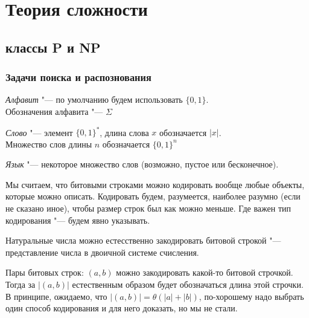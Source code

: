 
\setcounter{section}{4}
\chapter{Теория сложности}
\section{классы P и NP} 
\subsection{Задачи поиска и распознования}
\begin{Def}
	\textit{Алфавит} "--- по умолчанию будем использовать $\{0,1\}$.\\ 
	Обозначения алфавита "--- $\Sigma$
\end{Def}

\begin{Def}
	\textit{Слово} "--- элемент $\{0,1\}^*$, длина слова $x$ обозначается $|x|$.\\
	Множество слов длины $n$ обозначается $\{0, 1\}^n$\\
\end{Def}

\begin{Def}
	\textit{Язык} "--- некоторое множество слов (возможно, пустое или бесконечное).
\end{Def}

\begin{Rem}
	Мы считаем, что битовыми строками можно кодировать вообще любые объекты, которые можно описать.
	Кодировать будем, разумеется, наиболее разумно (если не сказано иное), чтобы размер строк был как можно меньше.
	Где важен тип кодирования "--- будем явно указывать.
\end{Rem}

\begin{exmp}
	Натуральные числа можно естесственно закодировать битовой строкой "--- представление числа в двоичной системе счисления.
\end{exmp}

\begin{exmp}
	Пары битовых строк: $(a, b)$ можно закодировать какой-то битовой строчкой.
	Тогда за $|(a, b)|$ естественным образом будет обозначаться длина этой строчки.
	В принципе, ожидаемо, что $|(a, b)| = \theta(|a| + |b|)$, по-хорошему надо выбрать один способ кодирования и для него доказать, но мы не стали.
\end{exmp}

